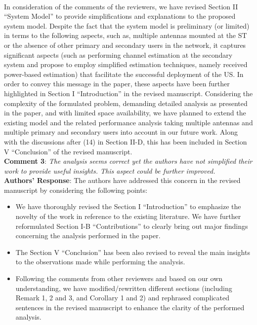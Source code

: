 \documentclass[12pt,a4wide,peerreview]{IEEEtran}
\begin{document}
\\
In consideration of the comments of the reviewers, we have revised Section II ``System Model'' to provide simplifications and explanations to the proposed system model. 
Despite the fact that the system model is preliminary (or limited) in terms to the following aspects, such as, multiple antennas mounted at the ST or the absence of other primary and secondary users in the network, it captures significant aspects (such as performing channel estimation at the secondary system and propose to employ simplified estimation techniques, namely received power-based estimation) that facilitate the successful deployment of the US. In order to convey this message in the paper, these aspects have been further highlighted in Section I ``Introduction'' in the revised manuscript. Considering the complexity of the formulated problem, demanding detailed analysis as presented in the paper, and with limited space availability, we have planned to extend the existing model and the related performance analysis taking multiple antennas and multiple primary and secondary users into account in our future work. Along with the discussions after (14) in Section II-D, this has been included in Section V ``Conclusion'' of the revised manuscript. \\
\textbf{Comment 3}:
\textit{
The analysis seems correct yet the authors have not simplified their work to provide useful insights.  This aspect could be further improved.
}
\\
\textbf{Authors' Response}: 
The authors have addressed this concern in the revised manuscript by considering the following points:\begin{itemize}
\item We have thoroughly revised the Section I ``Introduction'' to emphasize the novelty of the work in reference to the existing literature. We have further reformulated Section I-B ``Contributions'' to clearly bring out major findings concerning the analysis performed in the paper. 
\item The Section V ``Conclusion'' has been also revised to reveal the main insights to the observations made while performing the analysis.   
\item Following the comments from other reviewers and based on our own understanding, we have modified/rewritten different sections (including Remark 1, 2 and 3, and Corollary 1 and 2) and rephrased complicated sentences in the revised manuscript to enhance the clarity of the performed analysis.
\end{itemize} 
\end{document}
